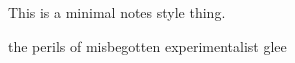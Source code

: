 \documentclass[reqno,9pt]{article}
\begin{document}




This is a minimal notes style thing.

\vspace{-0.2cm}
\begin{center}
 \fontsize{18}{18}\selectfont
 the perils of misbegotten experimentalist glee
 \end{center}
 \vspace{-0.3cm}
\end{document}
